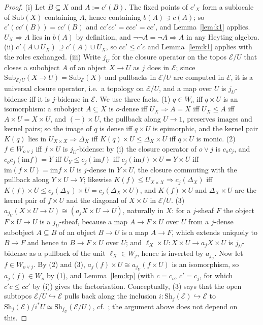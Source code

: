 \documentclass[11pt]{amsart}
\theoremstyle{definition}
\newcommand{\im}{\mathrm{im}}
\newcommand{\Sh}{\mathrm{Sh}}
\newcommand{\Sub}{\mathrm{Sub}}
\newcommand{\cE}{\mathcal E}
\begin{document}
\begin{proof}
(i) Let $B\subseteq X$ and $A:=c'(B)$. The fixed points of $c'_X$ form a
sublocale of $\Sub(X)$ containing $A$, hence containing $b(A)\ni c(A)$; so
$c'(cc'(B))=cc'(B)$ and $cc'cc'=ccc'=cc'$, and Lemma~\ref{lem:k1} applies.
$U_X\Rightarrow A$ lies in $b(A)$ by definition, and $\neg\neg A=\neg A
\Rightarrow A$ in any Heyting algebra. (ii) $c'(A\cup U_X)\supseteq c'(A)\cup
U_X$, so $cc'\le c'c$ and Lemma~\ref{lem:k1} applies with the roles
exchanged. (iii) Write $j_U$ for the closure operator on the topos $\cE/U$
that closes a subobject $A$ of an object $X\to U$ as $j$ does in $\cE$;
since $\Sub_{\cE/U}(X\to U)=\Sub_\cE(X)$ and pullbacks in $\cE/U$ are
computed in $\cE$, it is a universal closure operator, i.e.\ a topology on
$\cE/U$, and a map over $U$ is $j_U$-bidense iff it is $j$-bidense in
$\cE$. We use three facts. (1) $q\in W_o$ iff $q\times U$ is an
isomorphism: a subobject $A\subseteq X$ is $o$-dense iff $U_X\Rightarrow
A=X$ iff $U_X\le A$ iff $A\times U=X\times U$, and $(-)\times U$, the
pullback along $U\to1$, preserves images and kernel pairs; so the image of
$q$ is dense iff $q\times U$ is epimorphic, and the kernel pair $K(q)$ lies
in $U_{X\times X}\Rightarrow\Delta_X$ iff $K(q)\times U\le\Delta_X\times U$
iff $q\times U$ is monic. (2) $f\in W_{o\vee j}$ iff $f\times U$ is
$j_U$-bidense: by (i) the closure operator of $o\vee j$ is $c_oc_j$, and
$c_oc_j(\im f)=Y$ iff $U_Y\le c_j(\im f)$ iff $c_j(\im f)\times U=Y\times
U$ iff $\im(f\times U)=\im f\times U$ is $j$-dense in $Y\times U$, the
closure commuting with the pullback along $Y\times U\to Y$; likewise
$K(f)\le U_{X\times X}\Rightarrow c_j(\Delta_X)$ iff $K(f)\times U\le
c_j(\Delta_X)\times U=c_j(\Delta_X\times U)$, and $K(f)\times U$ and
$\Delta_X\times U$ are the kernel pair of $f\times U$ and the diagonal of
$X\times U$ in $\cE/U$. (3) $a_{j_U}(X\times U\to U)\cong(a_jX\times U\to
U)$, naturally in $X$: for a $j$-sheaf $F$ the object $F\times U\to U$ is a
$j_U$-sheaf, because a map $A\to F\times U$ over $U$ from a $j$-dense
subobject $A\subseteq B$ of an object $B\to U$ is a map $A\to F$, which
extends uniquely to $B\to F$ and hence to $B\to F\times U$ over $U$; and
$\ell_X\times U\colon X\times U\to a_jX\times U$ is $j_U$-bidense as a
pullback of the unit $\ell_X\in W_j$, hence is inverted by $a_{j_U}$.
Now let $f\in W_{o\vee j}$. By (2) and (3), $a_j(f)\times U\cong a_{j_U}
(f\times U)$ is an isomorphism, so $a_j(f)\in W_o$ by (1), and
Lemma~\ref{lem:kp} (with $c=c_o$, $c'=c_j$, for which $c'c\le cc'$ by (i))
gives the factorisation. Conceptually, (3) says that
the open subtopos $\cE/U\hookrightarrow\cE$ pulls back along the inclusion
$i\colon\Sh_j(\cE)\hookrightarrow\cE$ to $\Sh_j(\cE)/i^*U\simeq
\Sh_{j_U}(\cE/U)$, cf.\ \cite[A4.5]{Elephant}; the argument above does not
depend on this.


\end{proof}
\end{document}
